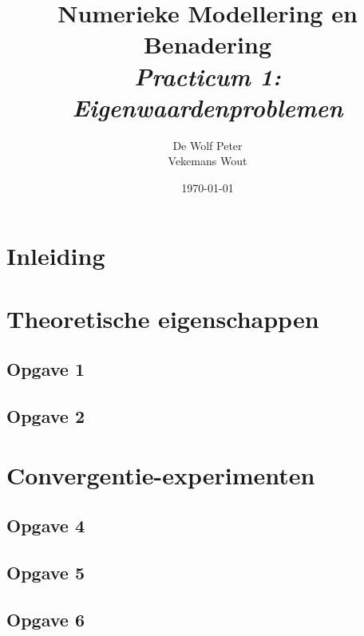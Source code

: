 \documentclass[a4paper, 12pt, titlepage]{report}
\begin{document}
\title{\textbf{Numerieke Modellering en Benadering}\\\textit{Practicum 1: Eigenwaardenproblemen}\\}
\author{De Wolf Peter\\ Vekemans Wout}

\date{\today}
\begin{titlepage}
	\maketitle
	\thispagestyle{empty}
\end{titlepage}

\newpage

\listoffigures

\newpage

\section{Inleiding}

\section{Theoretische eigenschappen}

\subsection{Opgave 1}

\subsection{Opgave 2}

\section{Convergentie-experimenten}

\subsection{Opgave 4}

\subsection{Opgave 5}

\subsection{Opgave 6}
\end{document}

